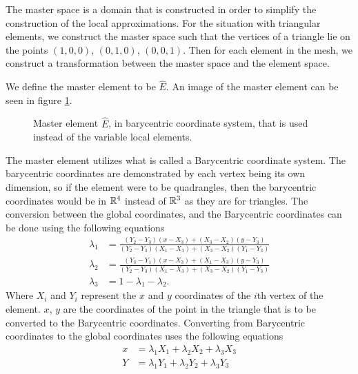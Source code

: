 \documentclass[../fem.tex]{subfile}
\begin{document}
The master space is a domain that is constructed in order to simplify the
construction of the local approximations. For the situation with triangular
elements, we construct the master space such that the vertices of a triangle
lie on the points $(1,0,0)$, $(0,1,0)$, $(0,0,1)$. Then for each element in the
mesh, we construct a transformation between the master space and the element
space.

We define the master element to be $\widehat{E}$. An image of the master
element can be seen in figure \ref{fig:master_element}.

\begin{figure}[htpb]
  \begin{center}
  \end{center}
  \caption{Master element $\widehat{E}$, in barycentric coordinate system, that
  is used instead of the variable local elements.}
  \label{fig:master_element}
\end{figure}

The master element utilizes what is called a Barycentric coordinate system. The
barycentric coordinates are demonstrated by each vertex being its own
dimension, so if the element were to be quadrangles, then the barycentric
coordinates would be in $\mathbb{R}^4$ instead of $\mathbb{R}^3$ as they are for triangles. The
conversion between the global coordinates, and the Barycentric coordinates can
be done using the following equations
\begin{align*}
  \lambda_1&=\frac{(Y_2-Y_3)(x-X_3)+(X_3-X_2)(y-Y_3)}{(Y_2-Y_3)(X_1-X_3)+(X_3-X_2)(Y_1-Y_3)}\\
  \lambda_2&=\frac{(Y_3-Y_1)(x-X_3)+(X_1-X_3)(y-Y_3)}{(Y_2-Y_3)(X_1-X_3)+(X_3-X_2)(Y_1-Y_3)}\\
  \lambda_3&=1-\lambda_1-\lambda_2.
\end{align*}
Where $X_i$ and $Y_i$ represent the $x$ and $y$ coordinates of the $i$th vertex
of the element. $x$, $y$ are the coordinates of the point in the triangle that
is to be converted to the Barycentric coordinates. Converting from Barycentric
coordinates to the global coordinates uses the following equations
\begin{align*}
  x&=\lambda_1X_1+\lambda_2X_2+\lambda_3X_3\\
  Y&=\lambda_1Y_1+\lambda_2Y_2+\lambda_3Y_3
\end{align*}
\end{document}
